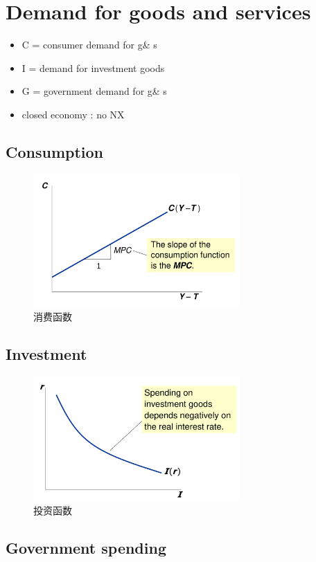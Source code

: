 \section{Demand for goods and services}

\begin{itemize}
    \item C = consumer demand for g\& s
    \item I = demand for investment goods
    \item G = government demand for g\& s
    \item closed economy : no NX
\end{itemize}

\subsection{Consumption}
\begin{figure}[htbp]
    \centering
    \includegraphics[width=0.7\textwidth]{image/ConsumptionFunction.png}
    \caption{消费函数}
\end{figure}


\subsection{Investment}
\begin{figure}[htbp]
    \centering
    \includegraphics[width=0.7\textwidth]{image/Investmentfunction.png}
    \caption{投资函数}
\end{figure}
\subsection{Government spending}

% 
